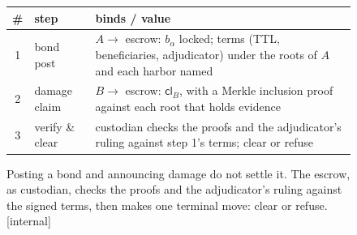 \begin{figure}[H]
\vspace{4pt}
\footnotesize
\renewcommand{\arraystretch}{1.12}
\begin{tabular}{@{}c l p{6.3cm}@{}}
\toprule
\# & step & binds / value \\
\midrule
1 & bond post & $A\to$ escrow: $b_\alpha$ locked; terms (TTL, beneficiaries, adjudicator) under the roots of $A$ and each harbor named \\
2 & damage claim & $B\to$ escrow: $\mathsf{cl}_B$, with a Merkle inclusion proof against each root that holds evidence \\
3 & verify \& clear & custodian checks the proofs and the adjudicator's ruling against step 1's terms; clear or refuse \\
\bottomrule
\end{tabular}
\normalsize
\caption{Posting a bond and announcing damage do not settle it. The escrow, as custodian, checks the proofs and the adjudicator's ruling against the signed terms, then makes one terminal move: clear or refuse. [internal]}
\label{fig:fh-settle-protocol}
\end{figure}
